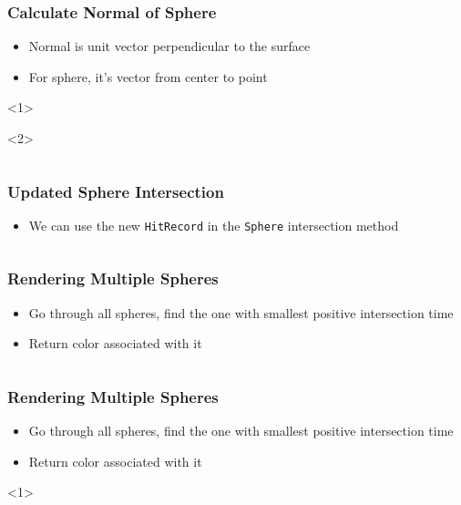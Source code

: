 \documentclass{beamer}
\begin{document}
\begin{frame}[fragile,t]
	\frametitle{Calculate Normal of Sphere}
	\begin{itemize}
		\item Normal is unit vector perpendicular to the surface
		\item For sphere, it's vector from center to point
	\end{itemize}
	\begin{onlyenv}
		\inputminted{python}{scripts/sphereNormal.py}
	\end{onlyenv}
\end{frame}

\begin{frame}[fragile]
	\frametitle{Updated Sphere Intersection}
	\begin{itemize}
		\item We can use the new \texttt{HitRecord} in the \texttt{Sphere} intersection method
	\end{itemize}
	\inputminted[fontsize=\small]{python}{scripts/updatedSphereIntersection.py}
\end{frame}

\begin{frame}[fragile]
	\frametitle{Rendering Multiple Spheres}
	\begin{itemize}
		\item Go through all spheres, find the one with smallest positive intersection time
		\item Return color associated with it
	\end{itemize}
	\inputminted[fontsize=\small]{python}{scripts/multipleSpheres.py}
\end{frame}

\begin{frame}[fragile]
	\frametitle{Rendering Multiple Spheres}
	\begin{itemize}
		\item Go through all spheres, find the one with smallest positive intersection time
		\item Return color associated with it
	\end{itemize}
	\begin{onlyenv}
		\inputminted[fontsize=\small]{python}{scripts/multipleSpheres2.py}
	\end{onlyenv}
\end{frame}
\end{document}
